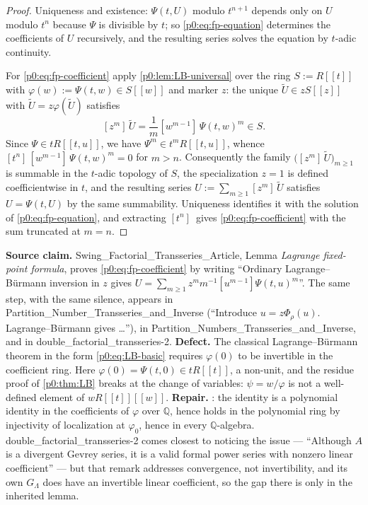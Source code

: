 \documentclass[11pt,a4paper,oneside]{book}
\theoremstyle{plain}
\theoremstyle{definition}
\theoremstyle{remark}
\newcommand{\Rat}{\mathbb{Q}}
\newcommand{\Coef}[1]{[#1]\,}
\begin{document}
\begin{proof}
Uniqueness and existence: $\Psi(t,U)$ modulo $t^{n+1}$ depends only on $U$
modulo $t^{n}$ because $\Psi$ is divisible by $t$; so
\eqref{p0:eq:fp-equation} determines the coefficients of $U$ recursively, and
the resulting series solves the equation by $t$-adic continuity.

For \eqref{p0:eq:fp-coefficient} apply \cref{p0:lem:LB-universal} over the
ring $S:=R[[t]]$ with $\varphi(w):=\Psi(t,w)\in S[[w]]$ and marker $z$: the
unique $\widetilde U\in zS[[z]]$ with $\widetilde U=z\varphi(\widetilde U)$
satisfies
\[
 \Coef{z^m}\widetilde U=\frac1m\Coef{w^{m-1}}\Psi(t,w)^m\in S .
\]
Since $\Psi\in tR[[t,u]]$, we have $\Psi^m\in t^mR[[t,u]]$, whence
$\Coef{t^n}\Coef{w^{m-1}}\Psi(t,w)^m=0$ for $m>n$.  Consequently the family
$\bigl(\Coef{z^m}\widetilde U\bigr)_{m\ge1}$ is summable in the $t$-adic
topology of $S$, the specialization $z=1$ is defined coefficientwise in $t$,
and the resulting series $U:=\sum_{m\ge1}\Coef{z^m}\widetilde U$ satisfies
$U=\Psi(t,U)$ by the same summability.  Uniqueness identifies it with the
solution of \eqref{p0:eq:fp-equation}, and extracting $\Coef{t^n}$ gives
\eqref{p0:eq:fp-coefficient} with the sum truncated at $m=n$.
\end{proof}

\begin{repairbox}
\textbf{Source claim.}  \textsf{Swing\_Factorial\_Transseries\_Article},
Lemma \emph{Lagrange fixed-point formula}, proves
\eqref{p0:eq:fp-coefficient} by writing ``Ordinary Lagrange--B\"urmann
inversion in $z$ gives $U=\sum_{m\ge1}z^mm^{-1}[u^{m-1}]\Psi(t,u)^m$''.  The
same step, with the same silence, appears in
\textsf{Partition\_Number\_Transseries\_and\_Inverse} (``Introduce
$u=z\Phi_\rho(u)$.  Lagrange--B\"urmann gives \dots''), in
\textsf{Partition\_Numbers\_Transseries\_and\_Inverse}, and in
\textsf{double\_factorial\_transseries-2}.
\textbf{Defect.}  The classical Lagrange--B\"urmann theorem in the form
\eqref{p0:eq:LB-basic} requires $\varphi(0)$ to be invertible in the
coefficient ring.  Here $\varphi(0)=\Psi(t,0)\in tR[[t]]$, a non-unit, and the
residue proof of \cref{p0:thm:LB} breaks at the change of variables: $\psi=w/\varphi$
is not a well-defined element of $wR[[t]][[w]]$.
\textbf{Repair.}  : the identity is a polynomial
identity in the coefficients of $\varphi$ over $\Rat$, hence holds in the
polynomial ring by injectivity of localization at $\varphi_0$, hence in every
$\Rat$-algebra.  \textsf{double\_factorial\_transseries-2} comes closest to
noticing the issue --- ``Although $A$ is a divergent Gevrey series, it is a
valid formal power series with nonzero linear coefficient'' --- but that
remark addresses convergence, not invertibility, and its own $G_\Lambda$ does
have an invertible linear coefficient, so the gap there is only in the
inherited lemma.
\end{repairbox}
\end{document}
